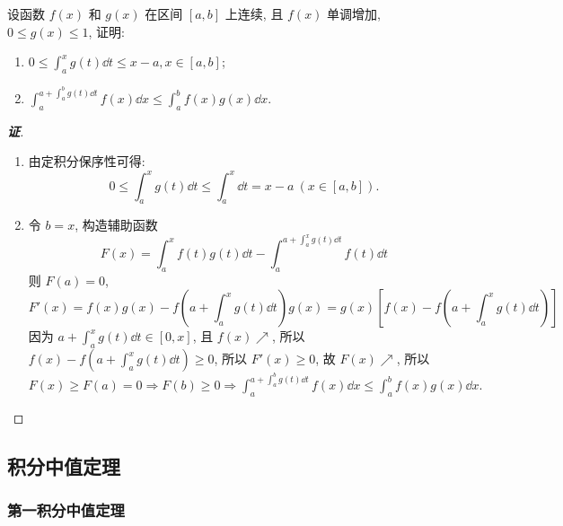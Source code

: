 \begin{example}
    设函数 $ f(x) $ 和 $ g(x) $ 在区间 $ [a, b] $ 上连续, 且 $ f(x) $ 单调增加, $  0 \leqslant g(x) \leqslant 1 $, 证明:
    \begin{enumerate}[label=(\arabic{*})]
        \item $ \displaystyle 0 \leqslant \int_{a}^{x} g(t) \dd t \leqslant x-a, x \in[a, b] $;
        \item $ \displaystyle \int_{a}^{a+\int_{a}^{b} g(t) \dd t} f(x) \dd x \leqslant \int_{a}^{b} f(x) g(x) \dd x .$
    \end{enumerate}
\end{example}
\begin{proof}[{\songti \textbf{证}}]
    \begin{enumerate}[label=(\arabic{*})]
        \item 由定积分保序性可得:
              $$0\leqslant \int_{a}^{x}g(t)\dd t\leqslant \int_{a}^{x}\dd t=x-a~ (x\in[a,b]).$$
        \item 令 $b=x$, 构造辅助函数
              $$F(x)=\int_{a}^{x}f(t)g(t)\dd t-\int_{a}^{a+\int_{a}^{x}g(t)\dd t}f(t)\dd t$$
              则 $\displaystyle F(a)=0$,
              $$F'(x)  =f(x)  g(x)  -f\left( a+\int _{a}^{x}g(t)  \dd t\right) g(x)  =g(x)  \left[ f(x)  -f\left( a+\int _{a}^{x}g(t)  \dd t\right) \right] $$
              因为 $\displaystyle a+\int _{a}^{x}g(t)  \dd t\in \left[ 0,x\right] $, 且 $f(x)\nearrow$, 所以 $\displaystyle f(x)  -f\left( a+\int _{a}^{x}g(t)  \dd t\right) \geqslant 0$, 所以 $F'(x)\geqslant 0$,
              故 $F(x)\nearrow$, 所以 $\displaystyle F(x)\geqslant F(a)=0\Rightarrow F(b)\geqslant 0\Rightarrow\int_{a}^{a+\int_{a}^{b} g(t) \dd t} f(x) \dd x \leqslant \int_{a}^{b} f(x) g(x) \dd x .$
    \end{enumerate}
\end{proof}

\subsection{积分中值定理}

\subsubsection{第一积分中值定理}

